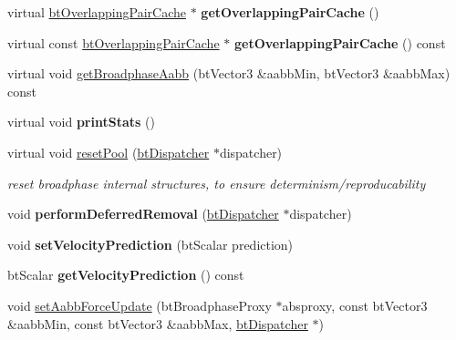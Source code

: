 \begin{DoxyCompactItemize}
\mbox{\label{structbtDbvtBroadphase_a22c2ebf38f3e5e83ad1177f3702125e1}} 
virtual \hyperlink{classbtOverlappingPairCache}{bt\+Overlapping\+Pair\+Cache} $\ast$ {\bfseries get\+Overlapping\+Pair\+Cache} ()
\item 
\mbox{\label{structbtDbvtBroadphase_a77d12e4bbe11f09527b6fc8f419aefee}} 
virtual const \hyperlink{classbtOverlappingPairCache}{bt\+Overlapping\+Pair\+Cache} $\ast$ {\bfseries get\+Overlapping\+Pair\+Cache} () const
\item 
virtual void \hyperlink{structbtDbvtBroadphase_ab546a1950f0f0f30dcc897b35e656e0b}{get\+Broadphase\+Aabb} (bt\+Vector3 \&aabb\+Min, bt\+Vector3 \&aabb\+Max) const
\item 
\mbox{\label{structbtDbvtBroadphase_aaed09532d263ce427bbbcc83360744c7}} 
virtual void {\bfseries print\+Stats} ()
\item 
\mbox{\label{structbtDbvtBroadphase_a9ee4895fb21ba7e638376aef18fd7b2b}} 
virtual void \hyperlink{structbtDbvtBroadphase_a9ee4895fb21ba7e638376aef18fd7b2b}{reset\+Pool} (\hyperlink{classbtDispatcher}{bt\+Dispatcher} $\ast$dispatcher)
\begin{DoxyCompactList}\small\item\em reset broadphase internal structures, to ensure determinism/reproducability \end{DoxyCompactList}\item 
\mbox{\label{structbtDbvtBroadphase_a0312f8146aadca9e83cd22fb10ad3b0e}} 
void {\bfseries perform\+Deferred\+Removal} (\hyperlink{classbtDispatcher}{bt\+Dispatcher} $\ast$dispatcher)
\item 
\mbox{\label{structbtDbvtBroadphase_a21a127eac7b3924751a610eca457f474}} 
void {\bfseries set\+Velocity\+Prediction} (bt\+Scalar prediction)
\item 
\mbox{\label{structbtDbvtBroadphase_a53becf9b388486176674a353a3d0f4f7}} 
bt\+Scalar {\bfseries get\+Velocity\+Prediction} () const
\item 
void \hyperlink{structbtDbvtBroadphase_a645dd617d0bbe7767859f424e2ee18c1}{set\+Aabb\+Force\+Update} (bt\+Broadphase\+Proxy $\ast$absproxy, const bt\+Vector3 \&aabb\+Min, const bt\+Vector3 \&aabb\+Max, \hyperlink{classbtDispatcher}{bt\+Dispatcher} $\ast$)
\end{DoxyCompactItemize}
